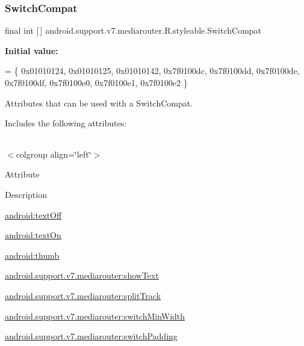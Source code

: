 \subsubsection{\texorpdfstring{Switch\+Compat}{SwitchCompat}}
{\footnotesize\ttfamily final int \mbox{[}$\,$\mbox{]} android.\+support.\+v7.\+mediarouter.\+R.\+styleable.\+Switch\+Compat\hspace{0.3cm}{\ttfamily [static]}}

{\bfseries Initial value\+:}
\begin{DoxyCode}
= \{
            0x01010124, 0x01010125, 0x01010142, 0x7f0100dc,
            0x7f0100dd, 0x7f0100de, 0x7f0100df, 0x7f0100e0,
            0x7f0100e1, 0x7f0100e2
        \}
\end{DoxyCode}
Attributes that can be used with a Switch\+Compat. 

Includes the following attributes\+:

\tabulinesep=1mm
\begin{longtabu} spread 0pt [c]{*{0}{|X[-1]}|}
\hline
\end{longtabu}
$<$colgroup align=\char`\"{}left\char`\"{}$>$ 

Attribute

Description 

{\ttfamily \hyperlink{classandroid_1_1support_1_1v7_1_1mediarouter_1_1R_1_1styleable_af14c1d76d2ab92ed4bfcba65bd4631ac}{android\+:text\+Off}}

{\ttfamily \hyperlink{classandroid_1_1support_1_1v7_1_1mediarouter_1_1R_1_1styleable_a2cb5bc58388a9257700ecc950397dd9e}{android\+:text\+On}}

{\ttfamily \hyperlink{classandroid_1_1support_1_1v7_1_1mediarouter_1_1R_1_1styleable_a73c6dc6f08ec175df6b39b3bbe5e4b9d}{android\+:thumb}}

{\ttfamily \hyperlink{classandroid_1_1support_1_1v7_1_1mediarouter_1_1R_1_1styleable_af24f7da08cafd932e8fb474f0845baf4}{android.\+support.\+v7.\+mediarouter\+:show\+Text}}

{\ttfamily \hyperlink{classandroid_1_1support_1_1v7_1_1mediarouter_1_1R_1_1styleable_a318ab94a649fd9ebfa42612d0c77726c}{android.\+support.\+v7.\+mediarouter\+:split\+Track}}

{\ttfamily \hyperlink{classandroid_1_1support_1_1v7_1_1mediarouter_1_1R_1_1styleable_a352987fa61ad38cf9d576099efe2ad26}{android.\+support.\+v7.\+mediarouter\+:switch\+Min\+Width}}

{\ttfamily \hyperlink{classandroid_1_1support_1_1v7_1_1mediarouter_1_1R_1_1styleable_a91af30593f8a1dbd3a82d1b6df6ae8b8}{android.\+support.\+v7.\+mediarouter\+:switch\+Padding}}

